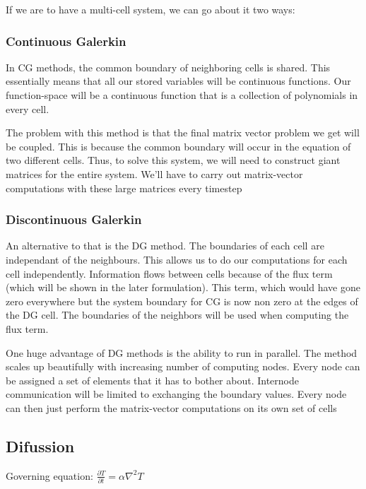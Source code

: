 \documentclass[11pt]{article}
\begin{document}
If we are to have a multi-cell system, we can go about it two ways:

\subsubsection{Continuous Galerkin}\label{continuous-galerkin}

In CG methods, the common boundary of neighboring cells is shared. This
essentially means that all our stored variables will be continuous
functions. Our function-space will be a continuous function that is a
collection of polynomials in every cell.

The problem with this method is that the final matrix vector problem we
get will be coupled. This is because the common boundary will occur in
the equation of two different cells. Thus, to solve this system, we will
need to construct giant matrices for the entire system. We'll have to
carry out matrix-vector computations with these large matrices every
timestep

\subsubsection{Discontinuous Galerkin}\label{discontinuous-galerkin}

An alternative to that is the DG method. The boundaries of each cell are
independant of the neighbours. This allows us to do our computations for
each cell independently. Information flows between cells because of the
flux term (which will be shown in the later formulation). This term,
which would have gone zero everywhere but the system boundary for CG is
now non zero at the edges of the DG cell. The boundaries of the
neighbors will be used when computing the flux term.

One huge advantage of DG methods is the ability to run in parallel. The
method scales up beautifully with increasing number of computing nodes.
Every node can be assigned a set of elements that it has to bother
about. Internode communication will be limited to exchanging the
boundary values. Every node can then just perform the matrix-vector
computations on its own set of cells

\subsection{Difussion}\label{difussion}

Governing equation:
\(\frac{\partial T}{\partial t} = \alpha \nabla^2 T\)
\end{document}
